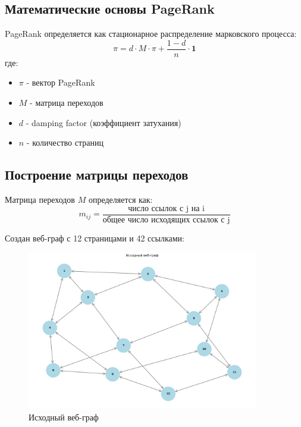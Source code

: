 \subsection*{Математические основы PageRank}

PageRank определяется как стационарное распределение марковского процесса:
\begin{equation}
\pi = d \cdot M \cdot \pi + \frac{1-d}{n} \cdot \mathbf{1}
\end{equation}
где:
\begin{itemize}
    \item $\pi$ - вектор PageRank
    \item $M$ - матрица переходов
    \item $d$ - damping factor (коэффициент затухания)
    \item $n$ - количество страниц
\end{itemize}

\subsection*{Построение матрицы переходов}

Матрица переходов $M$ определяется как:
\begin{equation}
m_{ij} = \frac{\text{число ссылок с j на i}}{\text{общее число исходящих ссылок с j}}
\end{equation}

Создан веб-граф с 12 страницами и 42 ссылками:

\begin{figure}[H]
    \centering
    \includegraphics[width=0.9\textwidth]{images/task2/original_web_graph.png}
    \caption{Исходный веб-граф}
\end{figure}

